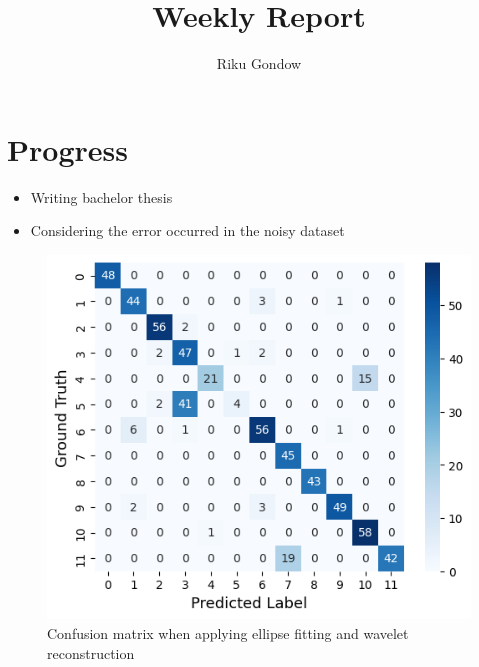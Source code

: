 \documentclass[dvipdfmx]{article}
\begin{document}
\title{Weekly Report}
\author{Riku Gondow}
\maketitle
\section{Progress}
\begin{itemize}
    \item Writing bachelor thesis
    \item Considering the error occurred in the noisy dataset
\end{itemize}

\begin{figure}[H]
\begin{center}
\includegraphics[width=0.8\linewidth]{./img/el_wav.png}
\end{center}
\caption{Confusion matrix when applying ellipse fitting and wavelet reconstruction}
\end{figure}
\end{document}
